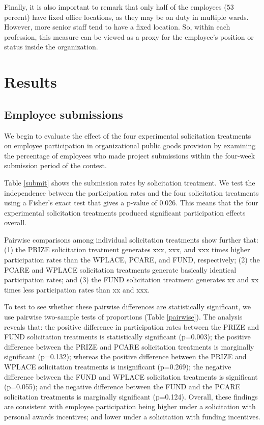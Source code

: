 \documentclass[12pt, titlepage]{article}
\begin{document}
Finally, it is also important to remark that only half of the employees
(\(53\) percent) have fixed office locations, as they may be on duty in
multiple wards. However, more senior staff tend to have a fixed
location. So, within each profession, this measure can be viewed as a
proxy for the employee's position or status inside the organization.



\section{Results}\label{results}

\subsection{Employee submissions}\label{employee-submissions}

We begin to evaluate the effect of the four experimental solicitation
treatments on employee participation in organizational public goods
provision by examining the percentage of employees who made project
submissions within the four-week submission period of the contest.



Table \ref{submit} shows the submission rates by solicitation treatment.
We test the independence between the participation rates and the four
solicitation treatments using a Fisher's exact test that gives a p-value
of 0.026. This means that the four experimental solicitation treatments
produced significant participation effects overall.

Pairwise comparisons among individual solicitation treatments show
further that: (1) the PRIZE solicitation treatment generates xxx, xxx,
and xxx times higher participation rates than the WPLACE, PCARE, and
FUND, respectively; (2) the PCARE and WPLACE solicitation treatments
generate basically identical participation rates; and (3) the FUND
solicitation treatment generates xx and xx times less participation
rates than xx and xxx.



To test to see whether these pairwise differences are statistically
significant, we use pairwise two-sample tests of proportions (Table
\ref{pairwise}). The analysis reveals that: the positive difference in
participation rates between the PRIZE and FUND solicitation treatments
is statistically significant (p=0.003); the positive difference between
the PRIZE and PCARE solicitation treatments is marginally significant
(p=0.132); whereas the positive difference between the PRIZE and WPLACE
solicitation treatments is insignificant (p=0.269); the negative
difference between the FUND and WPLACE solicitation treatments is
significant (p=0.055); and the negative difference between the FUND and
the PCARE solicitation treatments is marginally significant (p=0.124).
Overall, these findings are consistent with employee participation being
higher under a solicitation with personal awards incentives; and lower
under a solicitation with funding incentives.
\end{document}
